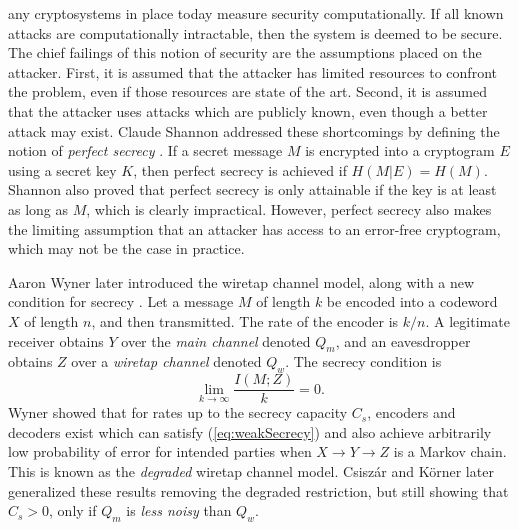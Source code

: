 \documentclass[10pt,twocolumn,twoside]{IEEEtran} \newlength{\pic}
\theoremstyle{definition}
\theoremstyle{remark}
\theoremstyle{plain}
\begin{document}
any cryptosystems in place today measure security computationally. If all known attacks are computationally intractable, then the system is deemed to be secure. The chief failings of this notion of security are the assumptions placed on the attacker. First, it is assumed that the attacker has limited resources to confront the problem, even if those resources are state of the art. Second, it is assumed that the attacker uses attacks which are publicly known, even though a better attack may exist. Claude Shannon addressed these shortcomings by defining the notion of \emph{perfect secrecy} \cite{Shannon49}. If a secret message $M$ is encrypted into a cryptogram $E$ using a secret key $K$, then perfect secrecy is achieved if $H(M|E)=H(M)$. Shannon also proved that perfect secrecy is only attainable if the key is at least as long as $M$, which is clearly impractical. However, perfect secrecy also makes the limiting assumption that an attacker has access to an error-free cryptogram, which may not be the case in practice.

Aaron Wyner later introduced the wiretap channel model, along with a new condition for secrecy \cite{Wyner75}. Let a message $M$ of length $k$ be encoded into a codeword $X$ of length $n$, and then transmitted. The rate of the encoder is $k/n$. A legitimate receiver obtains $Y$ over the \emph{main channel} denoted $Q_m$, and an eavesdropper obtains $Z$ over a \emph{wiretap channel} denoted $Q_w$. The secrecy condition is \begin{equation}\label{eq:weakSecrecy}
 \lim_{k\rightarrow\infty}\frac{I(M;Z)}{k}=0.
\end{equation}
Wyner showed that for rates up to the secrecy capacity $C_s$, encoders and decoders exist which can satisfy (\ref{eq:weakSecrecy}) and also achieve arbitrarily low probability of error for intended parties when $X\rightarrow Y\rightarrow Z$ is a Markov chain. This is known as the \emph{degraded} wiretap channel model. Csisz\'{a}r and K\"{o}rner \cite{Csiszar78} later generalized these results removing the degraded restriction, but still showing that $C_s > 0$, only if $Q_m$ is \emph{less noisy} than $Q_w$.
\end{document}
